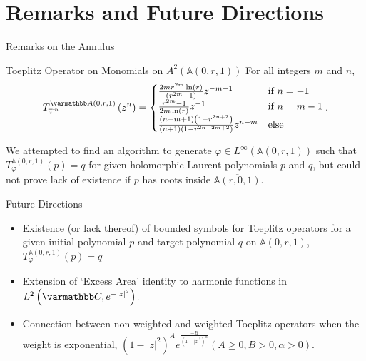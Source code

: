 \documentclass{reu_beamer}
\begin{document}
\section{Remarks and Future Directions}
\begin{frame}{Remarks on the Annulus}
    \begin{block}{Toeplitz Operator on Monomials on $A^{2}(\mathbb{A}(0,r,1))$}
        For all integers \(m\) and \(n\),
        \[
            T^{\mathbb{A}\left(0,r,1\right)}_{\ol{z}^m}\left(z^n\right) = 
            \begin{cases}
                \frac{2 m r^{2 m} \ln(r)}{\prn{r^{2 m} - 1}}z^{-m - 1} &\text{if}\ n = -1 \\
                \frac{r^{2 m} - 1}{2 m \ln(r)} z^{-1} &\text{if}\ n = m - 1 \\
                \frac{(n - m + 1)\prn{1 - r^{2 n+2}}}{(n+1)\prn{1 - r^{2 n - 2  m +2}}} z^{n-m} &\text{else}
            \end{cases}.
        \]
    \end{block}
    We attempted to find an algorithm to generate $\varphi\in L^{\infty}\left(\mathbb{A}\left(0,r,1\right)\right)$ such that $T^{\mathbb{A}(0,r,1)}_{\varphi}(p) = q$ for given holomorphic Laurent polynomials $p$ and $q$, but could not prove lack of existence if $p$ has roots inside $\overline{\mathbb{A}\left(r,0,1\right)}$.
\end{frame}
\begin{frame}{Future Directions}
    \begin{itemize}
        \item Existence (or lack thereof) of bounded symbols for Toeplitz operators for a given initial polynomial $p$ and target polynomial $q$ on $\mathbb{A}(0,r,1)$, $T^{\mathbb{A}(0,r,1)}_{\varphi}(p) = q$
        \newline
        \item Extension of `Excess Area' identity to harmonic functions in \(L^2\prn{\C, e^{-|z|^2}}\).
        \newline
        \item Connection between non-weighted and weighted Toeplitz operators when the weight is exponential, $(1-|z|^2)^{A}
        e^{\frac{-B}{(1-|z|^2)^{\alpha}}}(A\geq 0,B>0,\alpha>0)$.%
    \end{itemize}
\end{frame}
\end{document}

